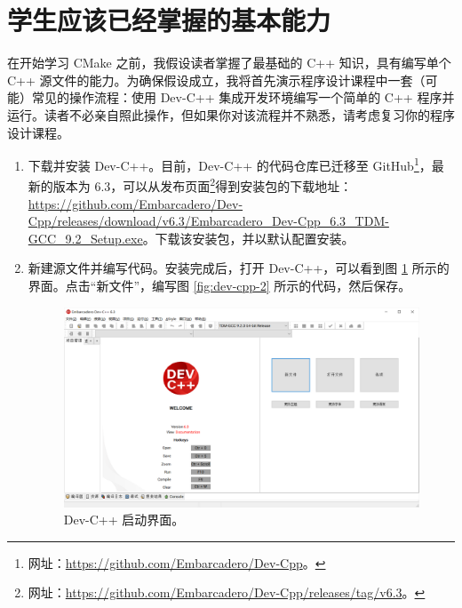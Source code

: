 
\section{学生应该已经掌握的基本能力}

在开始学习 CMake 之前，我假设读者掌握了最基础的 C++ 知识，具有编写单个 C++ 源文件的能力。为确保假设成立，我将首先演示程序设计课程中一套（可能）常见的操作流程：使用 Dev-C++ 集成开发环境编写一个简单的 C++ 程序并运行。读者不必亲自照此操作，但如果你对该流程并不熟悉，请考虑复习你的程序设计课程。

\begin{enumerate}
	\item 下载并安装 Dev-C++。目前，Dev-C++ 的代码仓库已迁移至 GitHub\footnote{网址：\url{https://github.com/Embarcadero/Dev-Cpp}。}，最新的版本为 6.3，可以从发布页面\footnote{网址：\url{https://github.com/Embarcadero/Dev-Cpp/releases/tag/v6.3}。}得到安装包的下载地址：\url{https://github.com/Embarcadero/Dev-Cpp/releases/download/v6.3/Embarcadero_Dev-Cpp_6.3_TDM-GCC_9.2_Setup.exe}。下载该安装包，并以默认配置安装。

	\item 新建源文件并编写代码。安装完成后，打开 Dev-C++，可以看到图 \ref{fig:dev-cpp-1} 所示的界面。点击“新文件”，编写图 \ref{fig:dev-cpp-2} 所示的代码，然后保存。

	\begin{figure}
		\centering
		\includegraphics[width=\linewidth]{assets/dev-cpp-1}
		\caption{Dev-C++ 启动界面。}
		\label{fig:dev-cpp-1}
	\end{figure}


\end{enumerate}

